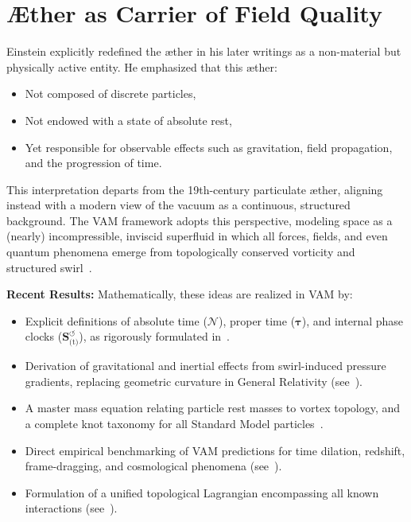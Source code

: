 \section{Æther as Carrier of Field Quality}

Einstein explicitly redefined the æther in his later writings as a non-material but physically active entity. He emphasized that this æther:
\begin{itemize}
    \item Not composed of discrete particles,
    \item Not endowed with a state of absolute rest,
    \item Yet responsible for observable effects such as gravitation, field propagation, and the progression of time.
\end{itemize}

This interpretation departs from the 19th-century particulate æther, aligning instead with a modern view of the vacuum as a continuous, structured background. The VAM framework adopts this perspective, modeling space as a (nearly) incompressible, inviscid superfluid in which all forces, fields, and even quantum phenomena emerge from topologically conserved vorticity and structured swirl~\cite{VAM-8, VAM-1, VAM-2}.

\vspace{0.7em}
\noindent\textbf{Recent Results:}
Mathematically, these ideas are realized in VAM by:
\begin{itemize}
    \item Explicit definitions of absolute time (\(\boldsymbol{\mathcal{N}}\)), proper time (\(\boldsymbol{\tau}\)), and internal phase clocks (\(\boldsymbol{S}^{\boldsymbol{\circlearrowleft}}_\text{(t)}\)), as rigorously formulated in~\cite{VAM-8, VAM-1}.
    \item Derivation of gravitational and inertial effects from swirl-induced pressure gradients, replacing geometric curvature in General Relativity (see~\cite{VAM-2, VAM-3, VAM-8}).
    \item A master mass equation relating particle rest masses to vortex topology, and a complete knot taxonomy for all Standard Model particles~\cite{VAM-8, VAM-11}.
    \item Direct empirical benchmarking of VAM predictions for time dilation, redshift, frame-dragging, and cosmological phenomena (see~\cite{VAM-3, VAM-8}).
    \item Formulation of a unified topological Lagrangian encompassing all known interactions (see~\cite{VAM-14}).
\end{itemize}

